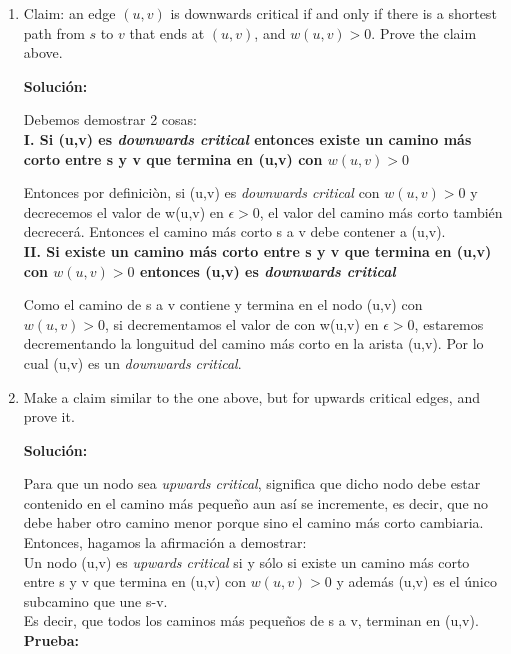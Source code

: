 \documentclass{article}
\begin{document}
  
  \begin{enumerate}
  \item Claim: an edge $(u,v)$ is downwards critical
    if and only if there is a shortest path from $s$ to $v$ that ends
    at $(u,v)$, and $w(u,v)>0$.  Prove the claim above.
  
  \textbf{Solución:}
  
  Debemos demostrar 2 cosas:\\
  
  \textbf{I. Si (u,v) es \textit{downwards critical} entonces existe un camino más corto entre  s y v que termina en (u,v) con $w(u,v) > 0$}
  
  Entonces por definiciòn, si (u,v) es \textit{downwards critical} con $w(u,v)>0$ y decrecemos el valor de w(u,v) en $\epsilon>0$, el valor del camino más corto también decrecerá. Entonces el camino más corto s a v debe contener a (u,v).\\
  
  \textbf{II. Si existe un camino más corto entre  s y v que termina en (u,v) con $w(u,v) > 0$ entonces (u,v) es \textit{downwards critical}}
  
  Como el camino de s a v contiene y termina en el nodo (u,v) con $w(u,v)>0$, si decrementamos el valor de con w(u,v) en $\epsilon>0$, estaremos decrementando la longuitud del camino más corto en la arista (u,v). Por lo cual (u,v) es un \textit{downwards critical}.
  
  \item Make a claim similar to the one above, but
    for upwards critical edges, and prove it.
  
  \textbf{Solución:}
  
  Para que un nodo sea \textit{upwards critical}, significa que dicho nodo debe estar contenido en el camino más pequeño aun así se incremente, es decir, que no debe haber otro camino menor porque sino el camino más corto cambiaria.\\
  
  Entonces, hagamos la afirmación a demostrar:\\
  Un nodo (u,v) es \textit{upwards critical} si y sólo si existe un camino más corto entre s y v que termina en (u,v) con $w(u,v) > 0$ y además (u,v) es el único subcamino que une s-v.\\
  Es decir, que todos los caminos más pequeños de s a v, terminan en (u,v).\\
  
  \textbf{Prueba:}
  

\end{enumerate}
\end{document}
